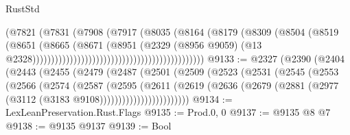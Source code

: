 \begin{lexlean}{RustStd}
\begin{coremodule}
                                                                (@7821
                                                                  (@7831
                                                                    (@7908
                                                                      (@7917
                                                                        (@8035
                                                                          (@8164
                                                                            (@8179
                                                                              (@8309
                                                                                (@8504
                                                                                  (@8519
                                                                                    (@8651
                                                                                      (@8665
                                                                                        (@8671
                                                                                          (@8951
                                                                                            (@2329
                                                                                              (@8956
                                                                                                @9059)
                                                                                              (@13
                                                                                                @2328))))))))))))))))))))))))))))))))))))))))))))))
@9133 := @2327
    (@2390
      (@2404
        (@2443
          (@2455
            (@2479
              (@2487
                (@2501
                  (@2509
                    (@2523
                      (@2531
                        (@2545
                          (@2553
                            (@2566
                              (@2574
                                (@2587
                                  (@2595
                                    (@2611
                                      (@2619
                                        (@2636
                                          (@2679
                                            (@2881
                                              (@2977 (@3112 (@3183 @9108))))))))))))))))))))))))
@9134 := LexLeanPreservation.Rust.Flags
@9135 := Prod.{0, 0}
@9137 := @9135 @8 @7
@9138 := @9135 @9137
@9139 := Bool

\end{coremodule}
\end{lexlean}
